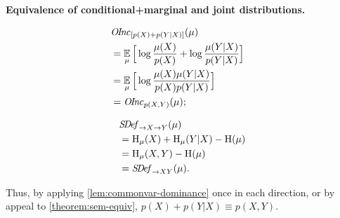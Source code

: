 \begin{subappendices}
\begin{lproof}\label{proof:sem-equiv-properties}
    \textbf{Equivalence of conditional+marginal and joint distributions.}\\
    \begin{minipage}{0.5\linewidth}
    \begin{align*}
        &\mathit{O\mskip-2.5muI\mskip-3.5mun\mskip-1.7muc}_{[p(X) + p(Y|X)]}(\mu) \\
        &= \operatorname*{\mathbb{E}}_{\mu} \Big[\log \frac{\mu(X)}{p(X)} + \log \frac{\mu(Y|X)}{p(Y|X)}\Big] 
                    \\
         &= \operatorname*{\mathbb{E}}_{\mu} \Big[\log \frac{\mu(X)\mu(Y|X)}{p(X)p(Y|X)}\Big] 
                    &  \\
         &= \mathit{O\mskip-2.5muI\mskip-3.5mun\mskip-1.7muc}_{p(X,Y)}(\mu);
    \end{align*}
    \end{minipage}
    \begin{minipage}{0.5\linewidth}
        \begin{align*}
            &\mathit{S\mskip-3.5muD\mskip-2.5mue\mskip-1.5muf}_{\to X \to Y}(\mu)\\
            &= \operatorname{\mathrm{H}}_\mu(X) + \operatorname{\mathrm{H}}_\mu(Y|X) - \operatorname{\mathrm{H}}(\mu)\\
            &= \operatorname{\mathrm{H}}_\mu(X,Y) - \operatorname{\mathrm{H}}(\mu) \\
            &= \mathit{S\mskip-3.5muD\mskip-2.5mue\mskip-1.5muf}_{\to XY}(\mu).
        \end{align*}
    \end{minipage}
    Thus, by applying \cref{lem:commonvar-dominance} once in each direction, or by appeal to \cref{theorem:sem-equiv}, 
    $p(X) + p(Y|X) \equiv p(X,Y)$. 
    
    
    

\end{lproof}
\end{subappendices}
